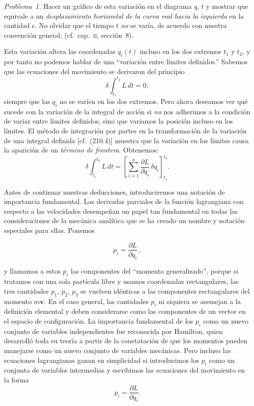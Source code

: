 \documentclass[12pt,a4paper]{book}
\newcommand{\vect}[1]{\mathbf{#1}}
\begin{document}
\textit{Problema~1.} Hacer un gráfico de esta variación en el diagrama $q$, $t$ y mostrar que equivale a un \textit{desplazamiento horizontal de la curva real hacia la izquierda} en la cantidad $\epsilon$. No olvidar que el tiempo $t$ \textit{no} se varía, de acuerdo con nuestra convención general; (cf.\ cap.~\textsc{ii}, sección~8).

Esta variación altera las coordenadas $q_i(t)$ incluso en los dos extremos $t_1$ y $t_2$, y por tanto no podemos hablar de una ``variación entre límites definidos.'' Sabemos que las ecuaciones del movimiento se derivaron del principio
\begin{equation}
\delta \int_{t_1}^{t_2} L \, dt = 0, \tag{53.2}
\end{equation}
siempre que las $q_i$ no se varíen en los dos extremos. Pero ahora deseamos ver qué sucede con la variación de la integral de acción si \textit{no} nos adherimos a la condición de variar entre límites definidos, sino que variamos la posición incluso en los límites. El método de integración por partes en la transformación de la variación de una integral definida [cf.\ (210.4)] muestra que la variación en los límites causa la aparición de un \textit{término de frontera}. Obtenemos:
\begin{equation}
\delta \int_{t_1}^{t_2} L \, dt = \left[ \sum_{i=1}^{n} \frac{\partial L}{\partial \dot{q}_i} \,\delta q_i \right]_{t_1}^{t_2}. \tag{53.3}
\end{equation}

Antes de continuar nuestras deducciones, introduciremos una notación de importancia fundamental. Las derivadas parciales de la función lagrangiana con respecto a las velocidades desempeñan un papel tan fundamental en todas las consideraciones de la mecánica analítica que se ha creado un nombre y notación especiales para ellas. Ponemos


\begin{equation}
p_i = \frac{\partial L}{\partial \dot{q}_i}\,, \tag{53.4}
\end{equation}

y llamamos a estos $p_i$ las componentes del ``momento generalizado'', porque si tratamos con una sola partícula libre y usamos coordenadas rectangulares, las tres cantidades $p_1$, $p_2$, $p_3$ se vuelven idénticas a las componentes rectangulares del momento $m\vect{v}$. En el caso general, las cantidades $p_i$ ni siquiera se asemejan a la definición elemental y deben considerarse como las componentes de un vector en el espacio de configuración. La importancia fundamental de los $p_i$ como un nuevo conjunto de variables independientes fue reconocida por Hamilton, quien desarrolló toda su teoría a partir de la constatación de que los momentos pueden manejarse como un nuevo conjunto de variables mecánicas. Pero incluso las ecuaciones lagrangianas ganan en simplicidad si introducimos los $p_i$ como un conjunto de variables intermedias y escribimos las ecuaciones del movimiento en la forma
\begin{equation}
\dot{p}_i = \frac{\partial L}{\partial q_i}. \tag{53.5}
\end{equation}
\end{document}
